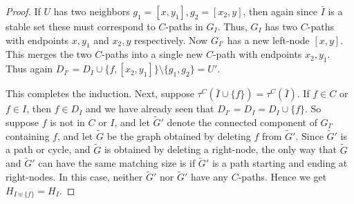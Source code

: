 \documentclass{toc}
\begin{document}
\begin{proof}
 If $U$ has two neighbors $g_1 = [x, y_1], g_2 = [x_2, y]$, then again since $\bar I$ is a stable set these must correspond to $C$-paths in $G_{I}$. Thus, $G_{I}$ has two $C$-paths with endpoints $x, y_1$ and $x_2, y$ respectively. Now $G_{I'}$ has a new left-node $[x,y]$. This merges the two $C$-paths into a single new $C$-path with endpoints $x_2, y_1$. Thus again $D_{I'} = D_{I} \cup \{ f, [x_2, y_1] \} \setminus \{g_1, g_2 \}  = U'$.
 
 This completes the induction. Next, suppose $\tau^C(\bar I \cup \{f \}) = \tau^C(\bar I)$. If $f \in C$ or $f \in I$, then  $f \in D_{I}$ and we have already seen that $D_{I'} = D_{I} = D_I \cup \{f \}$. So suppose $f$ is not in $C$ or $I$,  and let $\tilde G'$ denote the connected component  of $G_{I'}$ containing  $f$, and let $\tilde G$ be the  graph obtained by deleting $f$ from $\tilde G'$.  Since $\tilde G'$ is a path or cycle, and $\tilde G$ is obtained by deleting a right-node, the only way that $\tilde G$ and $\tilde G'$ can have the same matching size is if  $\tilde G'$ is a path starting and ending at right-nodes. In this case, neither $\tilde G'$ nor $\tilde G'$ have any $C$-paths. Hence we get $H_{I \uplus \{f \}}  = H_{I}$. 
\end{proof}
\end{document}

